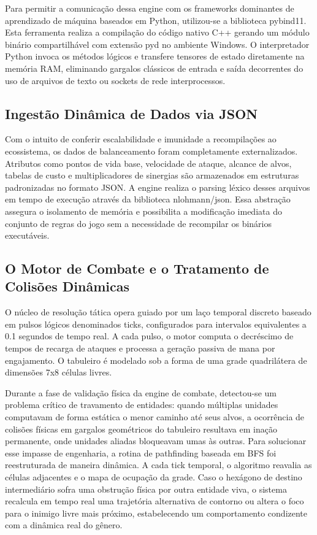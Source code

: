 \documentclass[12pt]{article}
\begin{document}
Para permitir a comunicação dessa engine com os frameworks dominantes de aprendizado de máquina baseados em Python, utilizou-se a biblioteca pybind11. Esta ferramenta realiza a compilação do código nativo C++ gerando um módulo binário compartilhável com extensão pyd no ambiente Windows. O interpretador Python invoca os métodos lógicos e transfere tensores de estado diretamente na memória RAM, eliminando gargalos clássicos de entrada e saída decorrentes do uso de arquivos de texto ou sockets de rede interprocessos.

\subsection{Ingestão Dinâmica de Dados via JSON}
Com o intuito de conferir escalabilidade e imunidade a recompilações ao ecossistema, os dados de balanceamento foram completamente externalizados. Atributos como pontos de vida base, velocidade de ataque, alcance de alvos, tabelas de custo e multiplicadores de sinergias são armazenados em estruturas padronizadas no formato JSON. A engine realiza o parsing léxico desses arquivos em tempo de execução através da biblioteca nlohmann/json. Essa abstração assegura o isolamento de memória e possibilita a modificação imediata do conjunto de regras do jogo sem a necessidade de recompilar os binários executáveis.

\subsection{O Motor de Combate e o Tratamento de Colisões Dinâmicas}
O núcleo de resolução tática opera guiado por um laço temporal discreto baseado em pulsos lógicos denominados ticks, configurados para intervalos equivalentes a 0.1 segundos de tempo real. A cada pulso, o motor computa o decréscimo de tempos de recarga de ataques e processa a geração passiva de mana por engajamento. O tabuleiro é modelado sob a forma de uma grade quadrilátera de dimensões 7x8 células livres.

Durante a fase de validação física da engine de combate, detectou-se um problema crítico de travamento de entidades: quando múltiplas unidades computavam de forma estática o menor caminho até seus alvos, a ocorrência de colisões físicas em gargalos geométricos do tabuleiro resultava em inação permanente, onde unidades aliadas bloqueavam umas às outras. Para solucionar esse impasse de engenharia, a rotina de pathfinding baseada em BFS foi reestruturada de maneira dinâmica. A cada tick temporal, o algoritmo reavalia as células adjacentes e o mapa de ocupação da grade. Caso o hexágono de destino intermediário sofra uma obstrução física por outra entidade viva, o sistema recalcula em tempo real uma trajetória alternativa de contorno ou altera o foco para o inimigo livre mais próximo, estabelecendo um comportamento condizente com a dinâmica real do gênero.
\end{document}
